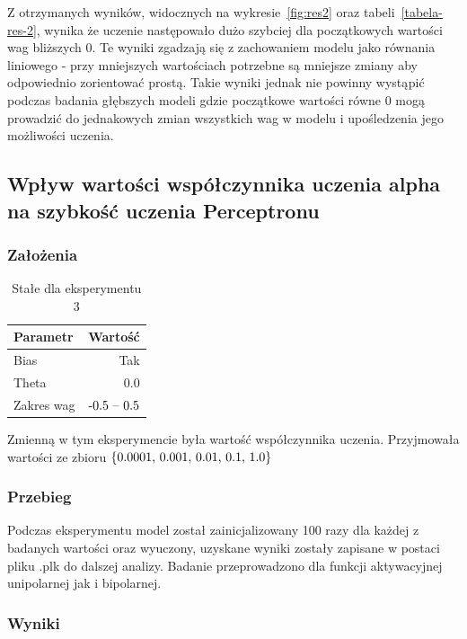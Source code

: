 \documentclass{article}
\begin{document}
Z otrzymanych wyników, widocznych na wykresie~\ref{fig:res2} oraz tabeli~\ref{tabela-res-2}, wynika że uczenie następowało dużo szybciej dla początkowych wartości wag bliższych 0. Te wyniki zgadzają się z zachowaniem modelu jako równania liniowego - przy mniejszych wartościach potrzebne są mniejsze zmiany aby odpowiednio zorientować prostą. Takie wyniki jednak nie powinny wystąpić podczas badania głębszych modeli gdzie początkowe wartości równe 0 mogą prowadzić do jednakowych zmian wszystkich wag w modelu i upośledzenia jego możliwości uczenia.

\newpage
\subsection{Wpływ wartości współczynnika uczenia alpha na szybkość uczenia Perceptronu}
\subsubsection*{Założenia}

\begin{table}[!h]
	\caption{Stałe dla eksperymentu 3}
	\label{tabela-const-3}
	\centering
	\begin{tabular}{lr}
		\toprule
		Parametr   & Wartość         \\
		\midrule
		Bias       & Tak               \\
		Theta      & 0.0               \\
		Zakres wag & \($-0.5 -- 0.5$\) \\
		\bottomrule
	\end{tabular}
\end{table}

Zmienną w tym eksperymencie była wartość współczynnika uczenia. Przyjmowała wartości ze zbioru \(\{$0.0001, 0.001, 0.01, 0.1, 1.0$\}\)

\subsubsection*{Przebieg}

Podczas eksperymentu model został zainicjalizowany 100 razy dla każdej z badanych wartości oraz wyuczony, uzyskane wyniki zostały zapisane w postaci pliku .plk do dalszej analizy. Badanie przeprowadzono dla funkcji aktywacyjnej unipolarnej jak i bipolarnej.

\subsubsection*{Wyniki}
\end{document}
